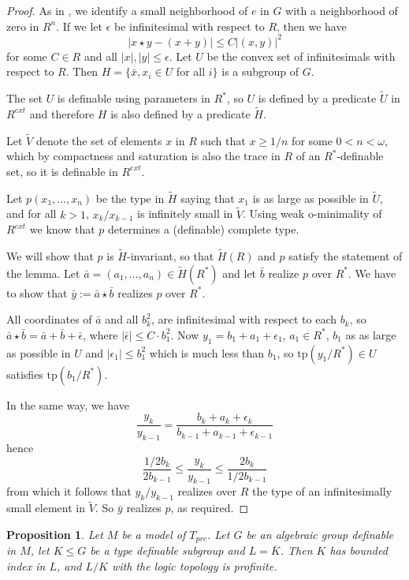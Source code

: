 \documentclass[12pt]{article}
\newtheorem{prop}[thm]{Proposition}
\theoremstyle{definition}
\theoremstyle{mystyle}
\theoremstyle{remark}
\newcommand{\PRCB}{T}
\newcommand{\tp}{\mathrm{tp}}
\begin{document}
\begin{proof}
As in \cite[Proposition 7.8]{NIP1}, we identify a small
neighborhood of $e$ in $G$ with a neighborhood of zero in $R^n$. If we let $\epsilon$ be
infinitesimal with respect to $R$, then we have $$|x \star y -
(x+y)|\leq C|(x,y)|^2$$ for some $C\in R$ and all $|x|,|y|\leq \epsilon$.
Let $U$ be the convex set of infinitesimals with respect to $R$.
Then $H = \{\bar x, x_i\in U$ for all $i\}$ is a subgroup of $G$.

The set $U$ is definable using parameters in $R^*$, so $U$ is defined by a predicate
$\tilde U$ in $R^{ext}$ and therefore  $H$ is also defined by a predicate $\tilde H$.

Let $\tilde V$ denote the
set of elements $x$ in $R$ such that $x\geq 1/n$ for some $0<n<\omega$, which by compactness and saturation is also the trace in $R$
of an $R^*$-definable set, so it is definable in $R^{ext}$.

Let $p(x_1,\ldots,x_n)$ be the type in $\tilde H$ saying that
$x_1$ is as large as possible in $\tilde U$, and for all $k>1$,
$x_k/x_{k-1}$ is infinitely small in $\tilde V$. Using weak o-minimality
of $R^{ext}$ we know that $p$
determines a (definable) complete type.

We will show that $p$ is $\tilde H$-invariant, so that $\tilde H(R)$ and $p$ satisfy the statement of the lemma. Let $\bar a
=(a_1,\ldots, a_n)\in \tilde H(R^*)$ and let $\bar b$ realize $p$
over $R^*$. We have to show that $\bar y := \bar a \star \bar b$
realizes $p$ over $R^*$.

All coordinates of $\bar a$ and
all $b_k^2$, are infinitesimal with respect to each $b_k$, so
$\bar a \star \bar b = \bar a + \bar b + \bar \epsilon$, where
$|\bar \epsilon| \leq C\cdot b_1^2$. Now $y_1 = b_1 + a_1
+\epsilon_1$, $a_1\in R^*$, $b_1$ as as large as possible in $U$
and $|\epsilon_1|\leq b_1^2$ which is much less than $b_1$, so
$\tp(y_1/R^*)\in U$ satisfies $\tp(b_1/R^{*})$.

In the same way, we have
$$\frac{y_k}{y_{k-1}} = \frac
{b_k+a_k+\epsilon_k}{b_{k-1}+a_{k-1}+\epsilon_{k-1}}$$ hence
$$\frac{1/2 b_k}{2b_{k-1}} \leq \frac {y_k}{y_{k-1}} \leq
\frac{2b_k}{1/2 b_{k-1}}$$ from which it follows that
$y_k/y_{k-1}$ realizes over $R$ the type of an infinitesimally
small element in $\tilde V$. So $\bar y$ realizes $p$, as required.
\end{proof}

\begin{prop} \label{PRCProfinite}
Let $M$ be a model of $\PRCB_{prc}$. Let $G$ be an algebraic group
definable in $M$, let $K\leq G$ be a type definable subgroup and
$L= \overline{K}$. Then $K$ has bounded index in $L$, and $L/K$
with the logic topology is profinite.
\end{prop}
\end{document}
